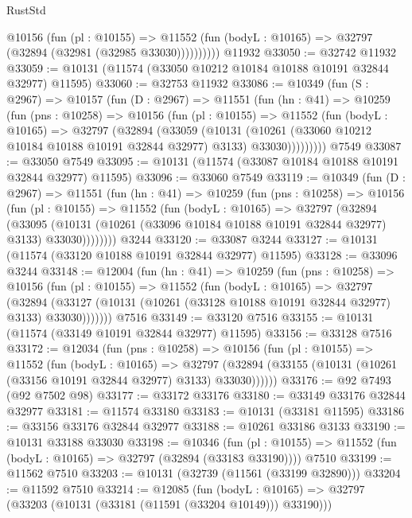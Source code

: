 \begin{lexlean}{RustStd}
\begin{coremodule}
            @10156
              (fun (pl : @10155) =>
              @11552 (fun (bodyL : @10165) => @32797 (@32894 (@32981 (@32985 @33030))))))))))
    @11932
@33050 := @32742 @11932
@33059 := @10131 (@11574 (@33050 @10212 @10184 @10188 @10191 @32844 @32977) @11595)
@33060 := @32753 @11932
@33086 := @10349
    (fun (S : @2967) =>
    @10157
      (fun (D : @2967) =>
      @11551
        (fun (hn : @41) =>
        @10259
          (fun (pns : @10258) =>
          @10156
            (fun (pl : @10155) =>
            @11552
              (fun (bodyL : @10165) =>
              @32797
                (@32894
                  (@33059
                    (@10131
                      (@10261 (@33060 @10212 @10184 @10188 @10191 @32844 @32977) @3133)
                      @33030)))))))))
    @7549
@33087 := @33050 @7549
@33095 := @10131 (@11574 (@33087 @10184 @10188 @10191 @32844 @32977) @11595)
@33096 := @33060 @7549
@33119 := @10349
    (fun (D : @2967) =>
    @11551
      (fun (hn : @41) =>
      @10259
        (fun (pns : @10258) =>
        @10156
          (fun (pl : @10155) =>
          @11552
            (fun (bodyL : @10165) =>
            @32797
              (@32894
                (@33095
                  (@10131 (@10261 (@33096 @10184 @10188 @10191 @32844 @32977) @3133) @33030))))))))
    @3244
@33120 := @33087 @3244
@33127 := @10131 (@11574 (@33120 @10188 @10191 @32844 @32977) @11595)
@33128 := @33096 @3244
@33148 := @12004
    (fun (hn : @41) =>
    @10259
      (fun (pns : @10258) =>
      @10156
        (fun (pl : @10155) =>
        @11552
          (fun (bodyL : @10165) =>
          @32797
            (@32894
              (@33127 (@10131 (@10261 (@33128 @10188 @10191 @32844 @32977) @3133) @33030)))))))
    @7516
@33149 := @33120 @7516
@33155 := @10131 (@11574 (@33149 @10191 @32844 @32977) @11595)
@33156 := @33128 @7516
@33172 := @12034
    (fun (pns : @10258) =>
    @10156
      (fun (pl : @10155) =>
      @11552
        (fun (bodyL : @10165) =>
        @32797 (@32894 (@33155 (@10131 (@10261 (@33156 @10191 @32844 @32977) @3133) @33030))))))
@33176 := @92 @7493 (@92 @7502 @98)
@33177 := @33172 @33176
@33180 := @33149 @33176 @32844 @32977
@33181 := @11574 @33180
@33183 := @10131 (@33181 @11595)
@33186 := @33156 @33176 @32844 @32977
@33188 := @10261 @33186 @3133
@33190 := @10131 @33188 @33030
@33198 := @10346
    (fun (pl : @10155) => @11552 (fun (bodyL : @10165) => @32797 (@32894 (@33183 @33190))))
    @7510
@33199 := @11562 @7510
@33203 := @10131 (@32739 (@11561 (@33199 @32890)))
@33204 := @11592 @7510
@33214 := @12085
    (fun (bodyL : @10165) => @32797 (@33203 (@10131 (@33181 (@11591 (@33204 @10149))) @33190)))

\end{coremodule}
\end{lexlean}
